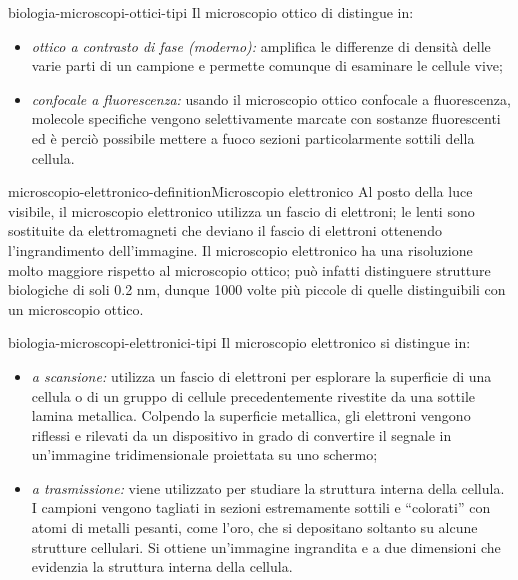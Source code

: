 \documentclass[preview]{standalone}
\begin{document}
\begin{snippet}{biologia-microscopi-ottici-tipi}
    Il microscopio ottico di distingue in:
    \begin{itemize}
        \item \textit{ottico a contrasto di fase (moderno):} amplifica le differenze di densità delle varie parti di
        un campione e permette comunque di esaminare le cellule vive;
        \item \textit{confocale a fluorescenza:} usando il microscopio ottico confocale a fluorescenza, molecole specifiche vengono
        selettivamente marcate con sostanze fluorescenti ed è perciò possibile mettere a fuoco
        sezioni particolarmente sottili della cellula.
    \end{itemize}
\end{snippet}


\begin{snippetdefinition}{microscopio-elettronico-definition}{Microscopio elettronico}
    Al posto della luce visibile, il microscopio elettronico utilizza un fascio di elettroni; le lenti
    sono sostituite da elettromagneti che deviano il fascio di elettroni ottenendo
    l'ingrandimento dell'immagine. Il microscopio elettronico ha una risoluzione molto
    maggiore rispetto al microscopio ottico; può infatti distinguere strutture biologiche di soli
    0.2 nm, dunque 1000 volte più piccole di quelle distinguibili con un microscopio ottico.
\end{snippetdefinition}

\begin{snippet}{biologia-microscopi-elettronici-tipi}
    Il microscopio elettronico si distingue in:
    \begin{itemize}
        \item \textit{a scansione:} utilizza un fascio di elettroni per esplorare la
        superficie di una cellula o di un gruppo di cellule precedentemente rivestite da una sottile
        lamina metallica. Colpendo la superficie metallica, gli elettroni vengono riflessi e rilevati da
        un dispositivo in grado di convertire il segnale in un'immagine tridimensionale proiettata su
        uno schermo;
        \item \textit{a trasmissione:} viene utilizzato per studiare la struttura interna
        della cellula. I campioni vengono tagliati in sezioni estremamente sottili e “colorati” con
        atomi di metalli pesanti, come l'oro, che si depositano soltanto su alcune strutture cellulari.
        Si ottiene un'immagine ingrandita e a due dimensioni che evidenzia la struttura interna
        della cellula.
    \end{itemize}
\end{snippet}
\end{document}

